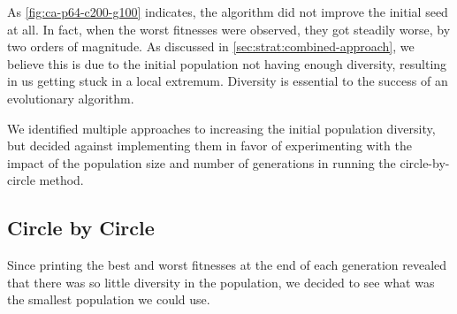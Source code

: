 \documentclass{article}
\begin{document}
As \autoref{fig:ca-p64-c200-g100} indicates, the algorithm did not improve the initial seed at all. In fact, when the worst fitnesses were observed, they got steadily worse, by two orders of magnitude. As discussed in \autoref{sec:strat:combined-approach}, we believe this is due to the initial population not having enough diversity, resulting in us getting stuck in a local extremum. Diversity is essential to the success of an evolutionary algorithm.

We identified multiple approaches to increasing the initial population diversity, but decided against implementing them in favor of experimenting with the impact of the population size and number of generations in running the circle-by-circle method.

\subsection{Circle by Circle}\label{sec:results:circle-by-circle}

Since printing the best and worst fitnesses at the end of each generation revealed that there was so little diversity in the population, we decided to see what was the smallest population we could use.
\end{document}
